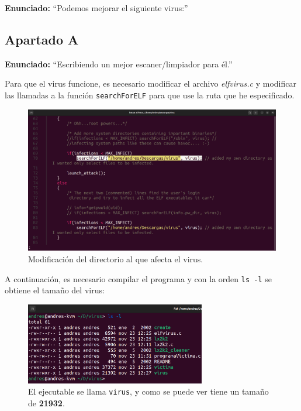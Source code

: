 \documentclass{article}
\begin{document}
\textbf{Enunciado: }``Podemos mejorar el siguiente virus:''
{}
\subsection*{Apartado A}

\textbf{Enunciado: }``Escribiendo un mejor escaner/limpiador para él.''

\bigskip

Para que el virus funcione, es necesario modificar el archivo \textit{elfvirus.c} y modificar las llamadas a la función \verb|searchForELF| para que use la ruta que he especificado.

\begin{figure}[H]
    \includegraphics[width=\textwidth]{imagenes/Captura desde 2022-11-25 17-29-47.png}
    \caption{Modificación del directorio al que afecta el virus.}
\end{figure}


A continuación, es necesario compilar el programa y con la orden \verb|ls -l| se obtiene el tamaño del virus:

\begin{figure}[H]
    \centering
    \includegraphics[width=0.7\textwidth]{imagenes/Captura desde 2022-11-23 12-28-06.png}
    \caption{El ejecutable se llama \texttt{virus}, y como se puede ver tiene un tamaño de \textbf{21932}.}
\end{figure}
\end{document}
